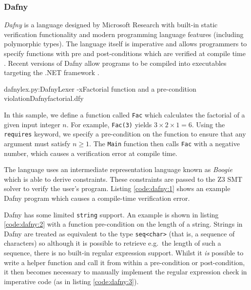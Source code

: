 \documentclass[a4paper,openany,12pt]{book}
\begin{document}
\subsubsection{Dafny}

\emph{Dafny} is a language designed by Microsoft Research with built-in static verification functionality and modern
programming language features (including polymorphic types).
The language itself is imperative and allows programmers to specify functions with pre and post-conditions which are
verified at compile time \citep{dafny2}.
Recent versions of Dafny allow programs to be compiled into executables targeting the .NET framework \citep{dafny}.

\begin{mycodefile}{dafnylex.py:DafnyLexer -x}{\label{code:dafny:1}Factorial function and a pre-condition violation}{Dafny}{factorial.dfy}
    
    In this sample, we define a function called \texttt{Fac} which calculates the factorial of a given input integer
    $n$.
    For example, \texttt{Fac(3)} yields $3 \times 2 \times 1 = 6$.
    Using the \texttt{requires} keyword, we specify a pre-condition on the function to ensure that any argument must
    satisfy $n \ge 1$.
    The \texttt{Main} function then calls \texttt{Fac} with a negative number, which causes a verification error at
    compile time.

    \vspace{0.5em}
\end{mycodefile}

The language uses an intermediate representation language known as \emph{Boogie} which is able to derive constraints.
These constraints are passed to the Z3 SMT solver to verify the user's program.
Listing \ref{code:dafny:1} shows an example Dafny program which causes a compile-time verification error.

Dafny has some limited \texttt{string} support.
An example is shown in listing \ref{code:dafny:2} with a function pre-condition on the length of a string.
Strings in Dafny are treated as equivalent to the type \texttt{seq<char>} (that is, a sequence of characters) so
although it is possible to retrieve e.g.\ the length of such a sequence, there is no built-in regular expression support.
Whilst it \emph{is} possible to write a helper function and call it from within a pre-condition or post-condition, it
then becomes necessary to manually implement the regular expression check in imperative code (as in listing \ref{code:dafny:3}).
\end{document}
